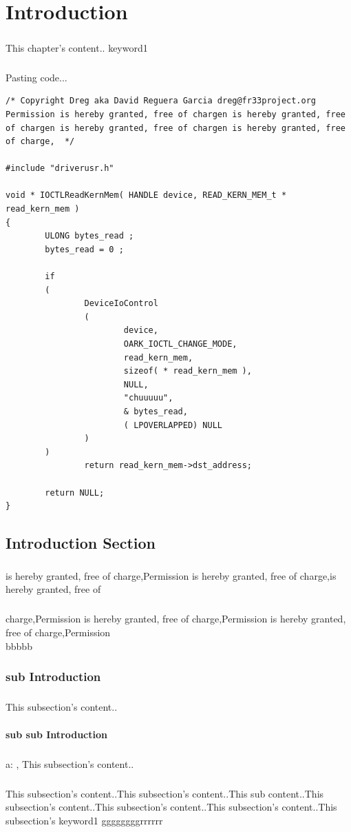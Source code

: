 \documentclass[12pt,a4paper,english]{book}
\newcommand{\keyword}[1]{\index{#1}#1}
\newcommand{\ocite}[1]{\footfullcite{#1}}
\newcommand{\oscite}[1]{\cite{#1}}
\newcommand{\paraph}{\paragraph{}}
\begin{document}
\titlespacing*{\chapter}{0pt}{-40pt}{15pt}
\fancyhead[LE,RO]{}
\tableofcontents
\fancyhead[LE,RO]{\slshape \rightmark}

\chapter{Introduction}
\paraph{}
This chapter's content.. \keyword{keyword1}

\paraph{}
Pasting code...
\lstset{language=C,caption=Descriptive Caption Text,label=DescriptiveLabels}
\begin{lstlisting}
/* Copyright Dreg aka David Reguera Garcia dreg@fr33project.org
Permission is hereby granted, free of chargen is hereby granted, free of chargen is hereby granted, free of chargen is hereby granted, free of charge,  */

#include "driverusr.h"

void * IOCTLReadKernMem( HANDLE device, READ_KERN_MEM_t * read_kern_mem )
{
        ULONG bytes_read ;
        bytes_read = 0 ;

        if
        (
                DeviceIoControl
                (
                        device,
                        OARK_IOCTL_CHANGE_MODE,
                        read_kern_mem,
                        sizeof( * read_kern_mem ),
                        NULL,
                        "chuuuuu",
                        & bytes_read,
                        ( LPOVERLAPPED) NULL
                )
        )
                return read_kern_mem->dst_address;

        return NULL;
}

\end{lstlisting}


\section{Introduction Section}
\paraph{}
is hereby granted, free of charge,Permission is hereby granted, free of charge,is hereby granted, free of
\paraph{}
charge,Permission is hereby granted, free of charge,Permission is hereby granted, free of charge,Permission \\
bbbbb
\subsection{sub Introduction}
\paraph{}
This subsection's content..
\oscite{usserman}

\subsubsection{sub sub Introduction}
\paraph{}
a: \ocite{usserman}, This subsection's content..

\paraph{}
This subsection's content..This subsection's content..This sub content..This subsection's content..This subsection's content..This subsection's content..This subsection's
\keyword{keyword1} ggggggggrrrrrr

\fancyhead[LE,RO]{}
\printbibliography[heading=bibintoc]

\clearpage
{}
\printindex
\end{document}
